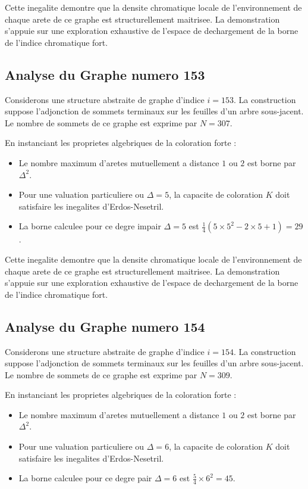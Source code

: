 \documentclass[11pt,a4paper]{article}
\begin{document}
Cette inegalite demontre que la densite chromatique locale de l'environnement de chaque arete de ce graphe est structurellement maitrisee. La demonstration s'appuie sur une exploration exhaustive de l'espace de dechargement de la borne de l'indice chromatique fort.

\subsection{Analyse du Graphe numero 153}
Considerons une structure abstraite de graphe d'indice $i = 153$. La construction suppose l'adjonction de sommets terminaux sur les feuilles d'un arbre sous-jacent. Le nombre de sommets de ce graphe est exprime par $N = 307$.

En instanciant les proprietes algebriques de la coloration forte :
\begin{itemize}
\item Le nombre maximum d'aretes mutuellement a distance $1$ ou $2$ est borne par $\Delta^2$.
\item Pour une valuation particuliere ou $\Delta = 5$, la capacite de coloration $K$ doit satisfaire les inegalites d'Erdos-Nesetril.
\item La borne calculee pour ce degre impair $\Delta = 5$ est $\frac{1}{4}(5 \times 5^2 - 2 \times 5 + 1) = 29$.
\end{itemize}

Cette inegalite demontre que la densite chromatique locale de l'environnement de chaque arete de ce graphe est structurellement maitrisee. La demonstration s'appuie sur une exploration exhaustive de l'espace de dechargement de la borne de l'indice chromatique fort.

\subsection{Analyse du Graphe numero 154}
Considerons une structure abstraite de graphe d'indice $i = 154$. La construction suppose l'adjonction de sommets terminaux sur les feuilles d'un arbre sous-jacent. Le nombre de sommets de ce graphe est exprime par $N = 309$.

En instanciant les proprietes algebriques de la coloration forte :
\begin{itemize}
\item Le nombre maximum d'aretes mutuellement a distance $1$ ou $2$ est borne par $\Delta^2$.
\item Pour une valuation particuliere ou $\Delta = 6$, la capacite de coloration $K$ doit satisfaire les inegalites d'Erdos-Nesetril.
\item La borne calculee pour ce degre pair $\Delta = 6$ est $\frac{5}{4} \times 6^2 = 45$.
\end{itemize}
\end{document}
